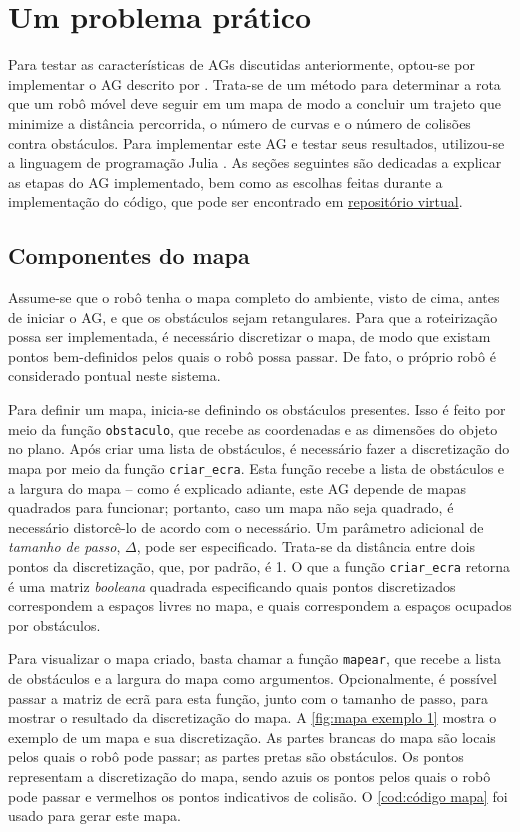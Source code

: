 \section{Um problema prático}

Para testar as características de AGs discutidas anteriormente, optou-se por implementar o AG descrito por \textcite{SEDIGHI2004}. Trata-se de um método para determinar a rota que um robô móvel deve seguir em um mapa de modo a concluir um trajeto que minimize a distância percorrida, o número de curvas e o número de colisões contra obstáculos. Para implementar este AG e testar seus resultados, utilizou-se a linguagem de programação Julia \cite{BEZANSON2015}. As seções seguintes são dedicadas a explicar as etapas do AG implementado, bem como as escolhas feitas durante a implementação do código, que pode ser encontrado em \href{https://github.com/phcentenaro7/GA-Robotica}{repositório virtual}.

\subsection{Componentes do mapa}

Assume-se que o robô tenha o mapa completo do ambiente, visto de cima, antes de iniciar o AG, e que os obstáculos sejam retangulares. Para que a roteirização possa ser implementada, é necessário discretizar o mapa, de modo que existam pontos bem-definidos pelos quais o robô possa passar. De fato, o próprio robô é considerado pontual neste sistema.

Para definir um mapa, inicia-se definindo os obstáculos presentes. Isso é feito por meio da função \texttt{obstaculo}, que recebe as coordenadas e as dimensões do objeto no plano. Após criar uma lista de obstáculos, é necessário fazer a discretização do mapa por meio da função \texttt{criar\_ecra}. Esta função recebe a lista de obstáculos e a largura do mapa -- como é explicado adiante, este AG depende de mapas quadrados para funcionar; portanto, caso um mapa não seja quadrado, é necessário distorcê-lo de acordo com o necessário. Um parâmetro adicional de \emph{tamanho de passo}, $\Delta$, pode ser especificado. Trata-se da distância entre dois pontos da discretização, que, por padrão, é 1. O que a função \texttt{criar\_ecra} retorna é uma matriz \emph{booleana} quadrada especificando quais pontos discretizados correspondem a espaços livres no mapa, e quais correspondem a espaços ocupados por obstáculos.

Para visualizar o mapa criado, basta chamar a função \texttt{mapear}, que recebe a lista de obstáculos e a largura do mapa como argumentos. Opcionalmente, é possível passar a matriz de ecrã para esta função, junto com o tamanho de passo, para mostrar o resultado da discretização do mapa. A \cref{fig:mapa exemplo 1} mostra o exemplo de um mapa e sua discretização. As partes brancas do mapa são locais pelos quais o robô pode passar; as partes pretas são obstáculos. Os pontos representam a discretização do mapa, sendo azuis os pontos pelos quais o robô pode passar e vermelhos os pontos indicativos de colisão. O \cref{cod:código mapa} foi usado para gerar este mapa.

